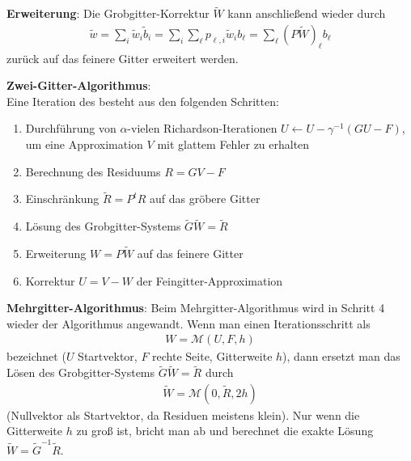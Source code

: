 \linie

\textbf{Erweiterung}:
Die Grobgitter-Korrektur $\widetilde{W}$ kann anschließend wieder durch
\begin{align*}
    \widetilde{w}
    = \sum_i \widetilde{w}_i \widetilde{b}_i
    = \sum_i \sum_\ell p_{\ell,i} \widetilde{w}_i b_\ell
    = \sum_\ell (P\widetilde{W})_\ell b_\ell
\end{align*}
zurück auf das feinere Gitter erweitert werden.

\linie

\textbf{Zwei-Gitter-Algorithmus}:\\
Eine Iteration des  besteht aus den folgenden Schritten:
\begin{enumerate}
    \item
    Durchführung von $\alpha$-vielen Richardson-Iterationen
    $U \leftarrow U - \gamma^{-1} (GU - F)$,
    um eine Approximation $V$ mit glattem Fehler zu erhalten
    
    \item
    Berechnung des Residuums $R = GV - F$
    
    \item
    Einschränkung $\widetilde{R} = P^t R$ auf das gröbere Gitter
    
    \item
    Lösung des Grobgitter-Systems $\widetilde{G} \widetilde{W} = \widetilde{R}$
    
    \item
    Erweiterung $W = P \widetilde{W}$ auf das feinere Gitter
    
    \item
    Korrektur $U = V - W$ der Feingitter-Approximation
\end{enumerate}

\linie

\textbf{Mehrgitter-Algorithmus}:
Beim Mehrgitter-Algorithmus wird in Schritt 4 wieder der Algorithmus angewandt.
Wenn man einen Iterationsschritt als
\begin{align*}
    W = \mathcal{M}(U, F, h)
\end{align*}
bezeichnet ($U$ Startvektor, $F$ rechte Seite, Gitterweite $h$),
dann ersetzt man das Lösen des Grobgitter-Systems $\widetilde{G} \widetilde{W} = \widetilde{R}$
durch
\begin{align*}
    \widetilde{W} = \mathcal{M}(0, \widetilde{R}, 2h)
\end{align*}
(Nullvektor als Startvektor, da Residuen meistens klein).
Nur wenn die Gitterweite $h$ zu groß ist, bricht man ab und berechnet die exakte Lösung
$\widetilde{W} = \widetilde{G}^{-1} \widetilde{R}$.

